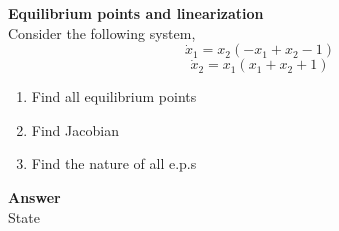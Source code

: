 \documentclass{homeworg}
\begin{document}
\exercise
\noindent
\textbf{Equilibrium points and linearization} \\
Consider the following system,\\
$$
\dot{x}_1 = x_2 (- x_1 + x_2 - 1)
$$
$$
\dot{x}_2 = x_1 (x_1 + x_2 + 1)
$$


\begin{enumerate}[label=(\alph*)]
\item Find all equilibrium points
\item Find Jacobian
\item Find the nature of all e.p.s
\end{enumerate}



\noindent
\textbf{Answer} \\
State


%
\end{document}
